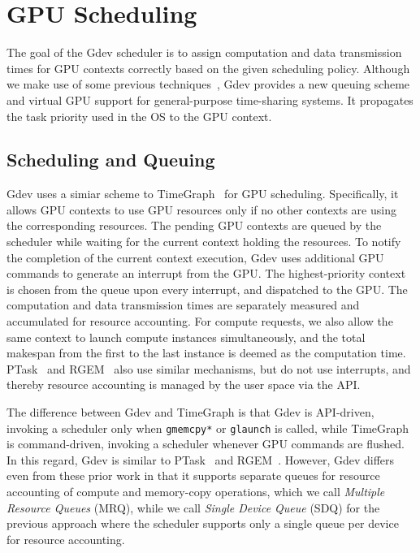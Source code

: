 \section{GPU Scheduling}
\label{sec:scheduling}

The goal of the Gdev scheduler is to assign computation and data
transmission times for GPU contexts correctly based on the given
scheduling policy.
Although we make use of some previous
techniques~\cite{Kato_RTSS11,Kato_ATC11}, Gdev provides a new queuing
scheme and virtual GPU support for general-purpose time-sharing systems.
It propagates the task priority used in the OS to the GPU context.


\subsection{Scheduling and Queuing}
\label{sec:scheduling_queueing}

Gdev uses a simiar scheme to TimeGraph~\cite{Kato_ATC11} for GPU
scheduling.
Specifically, it allows GPU contexts to use GPU resources only if no
other contexts are using the corresponding resources.
The pending GPU contexts are queued by the scheduler while waiting for
the current context holding the resources.
To notify the completion of the current context execution, Gdev
uses additional GPU commands to generate an interrupt from the GPU.
The highest-priority context is chosen from the queue upon every
interrupt, and dispatched to the GPU.
The computation and data transmission times are separately measured and
accumulated for resource accounting.
For compute requests, we also allow the same context to launch compute
instances simultaneously, and the total makespan from the first to the last
instance is deemed as the computation time.
PTask~\cite{Rossbach_SOSP11} and RGEM~\cite{Kato_RTSS11} also use
similar mechanisms, but do not use interrupts, and thereby resource
accounting is managed by the user space via the API.

The difference between Gdev and TimeGraph is that Gdev is API-driven,
invoking a scheduler only when \texttt{gmemcpy*} or \texttt{glaunch} is
called, while TimeGraph is command-driven, invoking a scheduler whenever
GPU commands are flushed.
In this regard, Gdev is similar to PTask~\cite{Rossbach_SOSP11} and
RGEM~\cite{Kato_RTSS11}.
However, Gdev differs even from these prior work in that it supports
separate queues for resource accounting of compute and memory-copy
operations, which we call \textit{Multiple Resource Queues} (MRQ), while
we call \textit{Single Device Queue} (SDQ) for the previous approach
where the scheduler supports only a single queue per device for resource
accounting.

